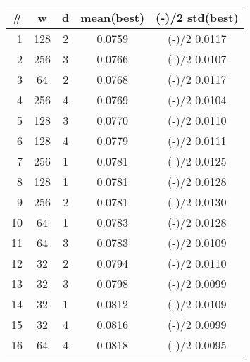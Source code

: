 \documentclass[border={15pt 1pt 5pt 1pt}, varwidth=38em]{standalone}
\begin{document}
\newcommand{\rpm}{\sbox0{$1$}\sbox2{$\scriptstyle\pm$}
  \raise\dimexpr(\ht0-\ht2)/2\relax\box2 }

\begin{table}[]
\centering
\begin{tabular}{r|cc|cc}
\# & w   & d & mean(best) & \rpm std(best) \\ \hline
1  & 128 & 2 & 0.0759     & \rpm0.0117    \\
2  & 256 & 3 & 0.0766     & \rpm0.0107    \\
3  & 64  & 2 & 0.0768     & \rpm0.0117    \\
4  & 256 & 4 & 0.0769     & \rpm0.0104    \\
5  & 128 & 3 & 0.0770     & \rpm0.0110    \\
6  & 128 & 4 & 0.0779     & \rpm0.0111    \\
7  & 256 & 1 & 0.0781     & \rpm0.0125    \\
8  & 128 & 1 & 0.0781     & \rpm0.0128    \\
9  & 256 & 2 & 0.0781     & \rpm0.0130    \\
10 & 64  & 1 & 0.0783     & \rpm0.0128    \\
11 & 64  & 3 & 0.0783     & \rpm0.0109    \\
12 & 32  & 2 & 0.0794     & \rpm0.0110    \\
13 & 32  & 3 & 0.0798     & \rpm0.0099    \\
14 & 32  & 1 & 0.0812     & \rpm0.0109    \\
15 & 32  & 4 & 0.0816     & \rpm0.0099    \\
16 & 64  & 4 & 0.0818     & \rpm0.0095   
\end{tabular}
\end{table}
\end{document}
